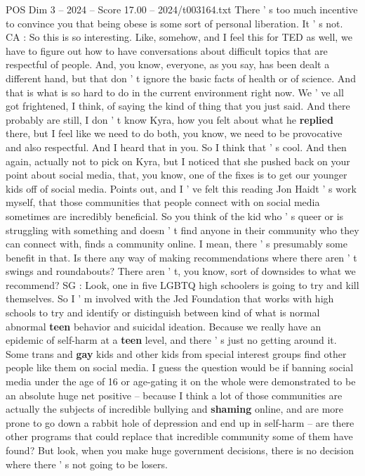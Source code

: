 \begin{textsample}{POS Dim 3 – 2024 – Score 17.00 – 2024/t003164.txt}
There ' s too much incentive to convince you that being obese is some sort of personal liberation.
It ' s not.
CA : So this is so interesting.
Like, somehow, and I feel this for TED as well, we have to figure out how to have conversations about difficult topics that are respectful of people.
And, you know, everyone, as you say, has been dealt a different hand, but that don ' t ignore the basic facts of health or of science.
And that is what is so hard to do in the current environment right now.
We ' ve all got frightened, I think, of saying the kind of thing that you just said.
And there probably are still, I don ' t know Kyra, how you felt about what he \textbf{replied} there, but I feel like we need to do both, you know, we need to be provocative and also respectful.
And I heard that in you.
So I think that ' s cool.
And then again, actually not to pick on Kyra, but I noticed that she pushed back on your point about social media, that, you know, one of the fixes is to get our younger kids off of social media.
Points out, and I ' ve felt this reading Jon Haidt ' s work myself, that those communities that people connect with on social media sometimes are incredibly beneficial.
So you think of the kid who ' s queer or is struggling with something and doesn ' t find anyone in their community who they can connect with, finds a community online.
I mean, there ' s presumably some benefit in that.
Is there any way of making recommendations where there aren ' t swings and roundabouts?
There aren ' t, you know, sort of downsides to what we recommend?
SG : Look, one in five LGBTQ high schoolers is going to try and kill themselves.
So I ' m involved with the Jed Foundation that works with high schools to try and identify or distinguish between kind of what is normal abnormal \textbf{teen} behavior and suicidal ideation.
Because we really have an epidemic of self-harm at a \textbf{teen} level, and there ' s just no getting around it.
Some trans and \textbf{gay} kids and other kids from special interest groups find other people like them on social media.
I guess the question would be if banning social media under the age of 16 or age-gating it on the whole were demonstrated to be an absolute huge net positive -- because I think a lot of those communities are actually the subjects of incredible bullying and \textbf{shaming} online, and are more prone to go down a rabbit hole of depression and end up in self-harm -- are there other programs that could replace that incredible community some of them have found?
But look, when you make huge government decisions, there is no decision where there ' s not going to be losers.

\end{textsample}
